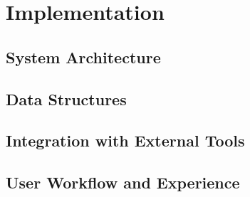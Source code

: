 \chapter[Chapter 3]{Implementation}
\label{chap:implementation}

\section{System Architecture}
\label{sec:system_architecture}

\section{Data Structures}
\label{sec:data_structures}

\section{Integration with External Tools}
\label{sec:integration_external_tools}

\section{User Workflow and Experience}
\label{sec:user_workflow_experience}